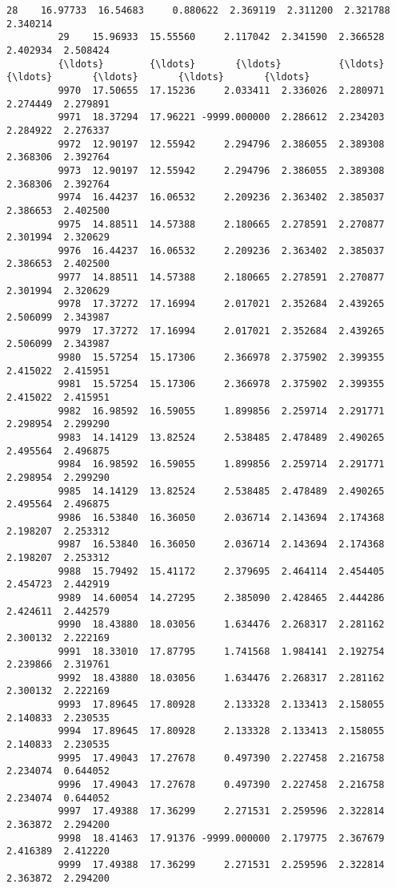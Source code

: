 \documentclass[11pt]{article}
\begin{document}
\begin{Verbatim}[commandchars=\\\{\}]
         28    16.97733  16.54683     0.880622  2.369119  2.311200  2.321788  2.340214   
         29    15.96933  15.55560     2.117042  2.341590  2.366528  2.402934  2.508424   
         {\ldots}        {\ldots}       {\ldots}          {\ldots}       {\ldots}       {\ldots}       {\ldots}       {\ldots}   
         9970  17.50655  17.15236     2.033411  2.336026  2.280971  2.274449  2.279891   
         9971  18.37294  17.96221 -9999.000000  2.286612  2.234203  2.284922  2.276337   
         9972  12.90197  12.55942     2.294796  2.386055  2.389308  2.368306  2.392764   
         9973  12.90197  12.55942     2.294796  2.386055  2.389308  2.368306  2.392764   
         9974  16.44237  16.06532     2.209236  2.363402  2.385037  2.386653  2.402500   
         9975  14.88511  14.57388     2.180665  2.278591  2.270877  2.301994  2.320629   
         9976  16.44237  16.06532     2.209236  2.363402  2.385037  2.386653  2.402500   
         9977  14.88511  14.57388     2.180665  2.278591  2.270877  2.301994  2.320629   
         9978  17.37272  17.16994     2.017021  2.352684  2.439265  2.506099  2.343987   
         9979  17.37272  17.16994     2.017021  2.352684  2.439265  2.506099  2.343987   
         9980  15.57254  15.17306     2.366978  2.375902  2.399355  2.415022  2.415951   
         9981  15.57254  15.17306     2.366978  2.375902  2.399355  2.415022  2.415951   
         9982  16.98592  16.59055     1.899856  2.259714  2.291771  2.298954  2.299290   
         9983  14.14129  13.82524     2.538485  2.478489  2.490265  2.495564  2.496875   
         9984  16.98592  16.59055     1.899856  2.259714  2.291771  2.298954  2.299290   
         9985  14.14129  13.82524     2.538485  2.478489  2.490265  2.495564  2.496875   
         9986  16.53840  16.36050     2.036714  2.143694  2.174368  2.198207  2.253312   
         9987  16.53840  16.36050     2.036714  2.143694  2.174368  2.198207  2.253312   
         9988  15.79492  15.41172     2.379695  2.464114  2.454405  2.454723  2.442919   
         9989  14.60054  14.27295     2.385090  2.428465  2.444286  2.424611  2.442579   
         9990  18.43880  18.03056     1.634476  2.268317  2.281162  2.300132  2.222169   
         9991  18.33010  17.87795     1.741568  1.984141  2.192754  2.239866  2.319761   
         9992  18.43880  18.03056     1.634476  2.268317  2.281162  2.300132  2.222169   
         9993  17.89645  17.80928     2.133328  2.133413  2.158055  2.140833  2.230535   
         9994  17.89645  17.80928     2.133328  2.133413  2.158055  2.140833  2.230535   
         9995  17.49043  17.27678     0.497390  2.227458  2.216758  2.234074  0.644052   
         9996  17.49043  17.27678     0.497390  2.227458  2.216758  2.234074  0.644052   
         9997  17.49388  17.36299     2.271531  2.259596  2.322814  2.363872  2.294200   
         9998  18.41463  17.91376 -9999.000000  2.179775  2.367679  2.416389  2.412220   
         9999  17.49388  17.36299     2.271531  2.259596  2.322814  2.363872  2.294200   
         

\end{Verbatim}
\end{document}
